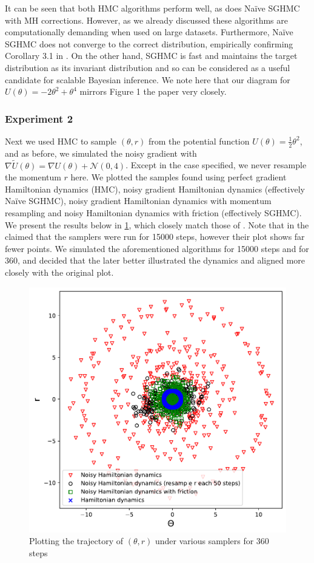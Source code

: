 It can be seen that both HMC algorithms perform well, as does Naïve SGHMC with MH corrections. However, as we already discussed these algorithms are computationally demanding when used on large datasets. Furthermore, Naïve SGHMC does not converge to the correct distribution, empirically confirming Corollary 3.1 in \cite{sghmc}. On the other hand, SGHMC is fast and maintains the target distribution as its invariant distribution and so can be considered as a useful candidate for scalable Bayesian inference. We note here that our diagram for $U(\theta) = -2\theta^2 + \theta^4$ mirrors Figure 1 the paper very closely.
\subsubsection*{Experiment 2}
Next we used HMC to sample $(\theta, r)$ from the potential function $U(\theta) = \frac{1}{2}\theta^2$, and as before, we simulated the noisy gradient with $\nabla \widetilde{U}(\theta) = \nabla U(\theta) + \mathcal{N}(0,4)$. Except in the case specified, we never resample the momentum $r$ here. We plotted the samples found using perfect gradient Hamiltonian dynamics (HMC), noisy gradient Hamiltonian dynamics (effectively Naïve SGHMC), noisy gradient Hamiltonian dynamics with momentum resampling and noisy Hamiltonian dynamics with friction (effectively SGHMC). We present the results below in \cref{fig:theta_r_samples}, which closely match those of \cite{sghmc}. Note that in \cite{sghmc} the \citeauthor{sghmc} claimed that the samplers were run for 15000 steps, however their plot shows far fewer points. We simulated the aforementioned algorithms for 15000 steps and for 360, and decided that the later better illustrated the dynamics and aligned more closely with the original plot.
\begin{figure}[h!]
    \centering
    \includegraphics[width=0.9\linewidth]{parts/Images/fig2a.pdf}%
    \caption{Plotting the trajectory of $(\theta, r)$ under various samplers for 360 steps}
     \label{fig:theta_r_samples}%
\end{figure}
